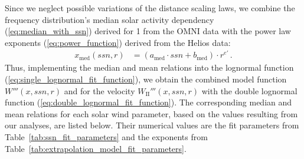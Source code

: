 Since we neglect possible variations of the distance scaling laws, we combine the frequency distribution’s median solar activity dependency (\ref{eq:median_with_ssn}) derived for \SI{1}{\au} from the OMNI data with the power law exponents (\ref{eq:power_function}) derived from the Helios data:
\begin{align}
	x_\text{med}(ssn,r) &= \left(a_\text{med} \cdot ssn + b_\text{med}\right) \cdot r^{e'}	\,.	\label{eq:general_sw_model}
\end{align}
Thus, implementing the median and mean relations into the lognormal function (\ref{eq:single_lognormal_fit_function}), we obtain the combined model function $W'''(x,ssn,r)$ and for the velocity $W_\text{II}'''(x,ssn,r)$ with the double lognormal function (\ref{eq:double_lognormal_fit_function}). The corresponding median and mean relations for each solar wind parameter, based on the values resulting from our analyses, are listed below. Their numerical values are the fit parameters from Table~\ref{tab:ssn_fit_parameters} and the exponents from Table~\ref{tab:extrapolation_model_fit_parameters}.

